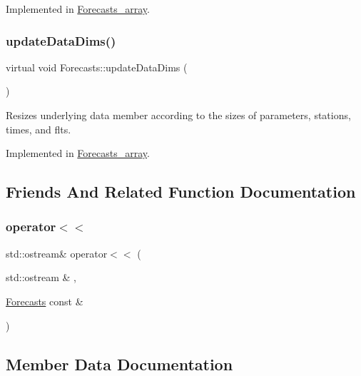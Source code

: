 Implemented in \mbox{\hyperlink{class_forecasts__array_af31e7741f2e048593cbec1c317210b65}{Forecasts\+\_\+array}}.

\mbox{\label{class_forecasts_a8c7d29af8edb5c3bc6a6aad2220506a9}} 
\subsubsection{\texorpdfstring{update\+Data\+Dims()}{updateDataDims()}}
{\footnotesize\ttfamily virtual void Forecasts\+::update\+Data\+Dims (\begin{DoxyParamCaption}{ }\end{DoxyParamCaption})\hspace{0.3cm}{\ttfamily [pure virtual]}}

Resizes underlying data member according to the sizes of parameters, stations, times, and flts. 

Implemented in \mbox{\hyperlink{class_forecasts__array_ab3fc780bb6a5cbf132457c8c336bc777}{Forecasts\+\_\+array}}.



\subsection{Friends And Related Function Documentation}
\mbox{\label{class_forecasts_a42c14120042eae287169092654f5b6c8}} 
\subsubsection{\texorpdfstring{operator$<$$<$}{operator<<}}
{\footnotesize\ttfamily std\+::ostream\& operator$<$$<$ (\begin{DoxyParamCaption}\item[{std\+::ostream \&}]{,  }\item[{\mbox{\hyperlink{class_forecasts}{Forecasts}} const \&}]{ }\end{DoxyParamCaption})\hspace{0.3cm}{\ttfamily [friend]}}



\subsection{Member Data Documentation}
\mbox{\label{class_forecasts_ace7fb459c34db19dfb77bc6861f9cdf5}} 
